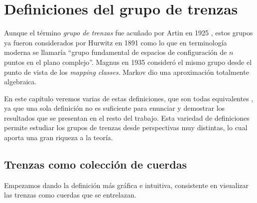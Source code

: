 \documentclass[TFG.tex]{subfiles}
\begin{document}
\chapter{Definiciones del grupo de trenzas}




Aunque el término \emph{grupo de trenzas} fue acuñado por Artin en 1925 \cite{ArtinA}, estos grupos ya fueron considerados por Hurwitz en 1891 \cite{Hur} como lo que en terminología moderna se llamaría ``grupo fundamental de espacios de configuración de $n$ puntos en el plano complejo''. Magnus en 1935 \cite{Magnus} consideró el mismo grupo desde el punto de vista de los \emph{mapping classes}. Markov \cite{Markoff} dio una aproximación totalmente algebraica. 

En este capítulo veremos varias de estas definiciones, que son todas equivalentes \cite{Zariski}, ya que una sola definición no es suficiente para enunciar y demostrar los resultados que se presentan en el resto del trabajo. Esta variedad de definiciones permite estudiar los grupos de trenzas desde perspectivas muy distintas, lo cual aporta una gran riqueza a la teoría.

\section{Trenzas como colección de cuerdas}
Empezamos dando la definición más gráfica e intuitiva, consistente en visualizar las trenzas como cuerdas que se entrelazan. 
\end{document}
